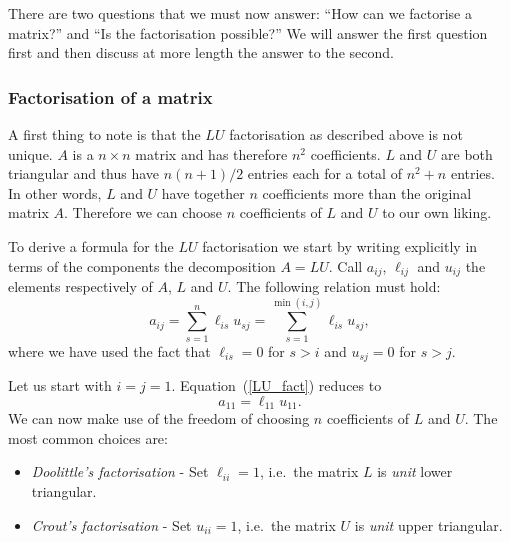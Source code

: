 There are two questions that we must now answer: ``How can we
factorise a matrix?'' and ``Is the factorisation possible?''  We will
answer the first question first and then discuss at more length the
answer to the second.

\subsubsection{Factorisation of a matrix}

A first thing to note is that the $L U$ factorisation as described
above is not unique.   $A$ is a $n \times n$ matrix and has therefore
$n^2$ coefficients.   $L$ and $U$ are both triangular and thus have
$n(n+1)/2$ entries each for a total of $n^2 + n$ entries.
In other words, $L$ and $U$ have together $n$ coefficients more than the
original matrix $A$.  Therefore we can choose $n$ coefficients of $L$
and $U$ to our own liking.    

To derive a formula for the $LU$ factorisation we start by writing
explicitly in terms of the components the decomposition $A = L U$.
Call $a_{i j}$, $\ell_{i j}$ and $u_{i j}$ the elements respectively
of $A$, $L$ and $U$.    The following relation must hold:
%
\begin{equation}
  a_{i j} = \sum_{s=1}^n \ell_{i s} u_{s j} = 
  \sum_{s=1}^{\min(i,j)} \ell_{i s} u_{s j} ,
  \label{LU_fact}
\end{equation}
%
where we have used the fact that $\ell_{i s} = 0$ for $s>i$ and $u_{s
j}=0$ for $s > j$.

Let us start with $i=j=1$.   Equation~(\ref{LU_fact}) reduces to
%
\begin{equation*}
 a_{1 1} = \ell_{1 1} u_{1 1} .
\end{equation*}
%
We can now make use of the freedom of choosing $n$ coefficients of $L$
and $U$.     The most common choices are:
%
\begin{itemize}
%
\item \textit{Doolittle's factorisation} - Set $\ell_{i i} = 1$,
i.e.\ the matrix $L$ is \textit{unit} lower triangular.
%
\item \textit{Crout's factorisation} - Set $u_{i i} = 1$, i.e.\ the
matrix $U$ is \textit{unit} upper triangular.
%
\end{itemize}

